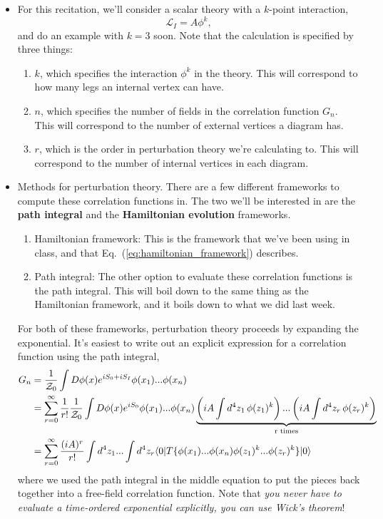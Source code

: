 \documentclass[12pt, oneside]{article}   	%
\theoremstyle{definition}
\begin{document}
\begin{itemize}
	\item For this recitation, we'll consider a scalar theory with a $k$-point interaction,
	\begin{equation}
		\mathcal L_I = A \phi^k,
	\end{equation}
	and do an example with $k = 3$ soon. Note that the calculation is specified by three things:
	\begin{enumerate}
		\item $k$, which specifies the interaction $\phi^k$ in the theory. This will correspond to how many legs an internal vertex can have.
		\item $n$, which specifies the number of fields in the correlation function $G_n$. This will correspond to the number of external vertices a diagram has. 
		\item $r$, which is the order in perturbation theory we're calculating to. This will correspond to the number of internal vertices in each diagram. 
	\end{enumerate}
	
	\item Methods for perturbation theory. There are a few different frameworks to compute these correlation functions in. The two we'll be interested in are the \textbf{path integral} and the \textbf{Hamiltonian evolution} frameworks. 
	\begin{enumerate}
	    	\item Hamiltonian framework: This is the framework that we've been using in class, and that Eq.~(\ref{eq:hamiltonian_framework}) describes. 
		\item Path integral: The other option to evaluate these correlation functions is the path integral. This will boil down to the same thing as the Hamiltonian framework, and it boils down to what we did last week.
	\end{enumerate}
	For both of these frameworks, perturbation theory proceeds by expanding the exponential. It's easiest to write out an explicit expression for a correlation function using the path integral,
	\begin{align} \begin{split}
			G_n &= \frac{1}{\mathcal Z_0} \int D\phi(x) e^{iS_0 + i S_I} \phi(x_1) ... \phi(x_n) \\
			&= \sum_{r = 0}^\infty \frac{1}{r!}\frac{1}{\mathcal Z_0} \int D\phi(x) e^{i S_0} \phi(x_1) ... \phi(x_n) \underbrace{\left( i A \int d^4 z_1\, \phi(z_1)^k \right) ... \left( i A \int d^4 z_r\, \phi(z_r)^k \right)}_{\textnormal{r times}} \\
			&= \sum_{r = 0}^\infty \frac{(iA)^r}{r!} \int d^4 z_1 ... \int d^4 z_r \langle 0 | T\{ \phi(x_1) ... \phi(x_n) \phi(z_1)^k ... \phi(z_r)^k \} |0\rangle
	\end{split} \end{align}
	where we used the path integral in the middle equation to put the pieces back together into a free-field correlation function. Note that \textit{you never have to evaluate a time-ordered exponential explicitly, you can use Wick's theorem}! 
	

\end{itemize}
\end{document}
